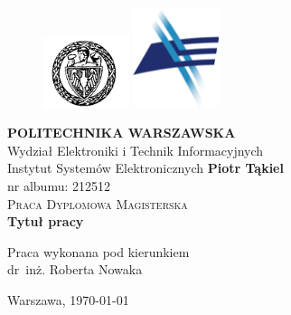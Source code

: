 \documentclass[../thesis.tex]{subfiles}
\begin{document}
\begin{titlepage} 

\begin{figure}
        \includegraphics[width=2.5cm]{gfx/logo_pw} \hfill
        \includegraphics[width=2.5cm]{gfx/logo_weiti}
\end{figure}

\begin{center}

\LARGE{\textbf{POLITECHNIKA WARSZAWSKA}}\\
\Large{Wydział Elektroniki i Technik Informacyjnych}\\
\large{Instytut Systemów Elektronicznych}				%
\vfill
\vfill
\huge \textbf{Piotr Tąkiel}\\  						 
\large{nr albumu: 212512}\\[1cm]
\textsc{\Large Praca Dyplomowa Magisterska}\\[1,5cm]     %
\huge \textbf{Tytuł pracy}\\[2cm] %
\vfill

\begin{flushright}
\large{Praca wykonana pod kierunkiem\\
dr~inż. Roberta Nowaka}\\[1cm]                     	
\end{flushright}

\large{Warszawa, \today}

\end{center}

\end{titlepage} 
\pagestyle{empty}
\cleardoublepage 
\end{document}
